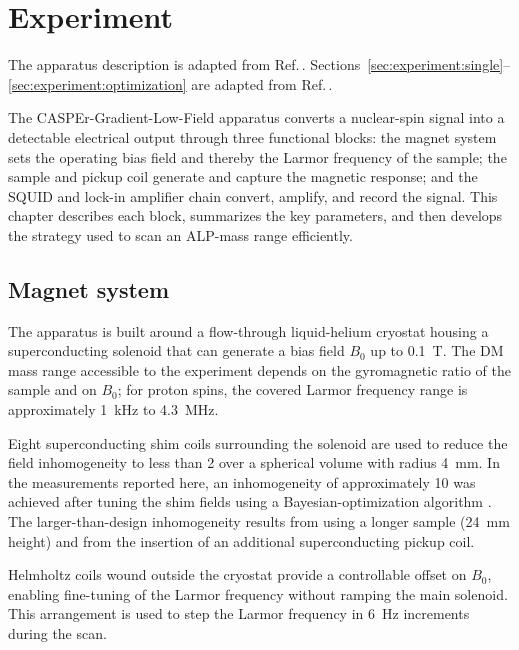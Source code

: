 \chapter{Experiment}\label{chap:experiment}
\begin{jointwork}
    The apparatus description is adapted from Ref.\,\cite{Walter2024_LFthermal}.
    Sections~\ref{sec:experiment:single}--\ref{sec:experiment:optimization} are adapted from Ref.\,\cite{Yuzhe2023_FrequencyScanning}.
\end{jointwork}

The CASPEr-Gradient-Low-Field apparatus converts a nuclear-spin signal into a detectable electrical output through three functional blocks: the magnet system sets the operating bias field and thereby the Larmor frequency of the sample; the sample and pickup coil generate and capture the magnetic response; and the SQUID and lock-in amplifier chain convert, amplify, and record the signal.
This chapter describes each block, summarizes the key parameters, and then develops the strategy used to scan an ALP-mass range efficiently.

\section{Magnet system}\label{sec:apparatus:magnet}

The apparatus is built around a flow-through liquid-helium cryostat housing a superconducting solenoid that can generate a bias field $B_0$ up to \SI{0.1}{\tesla}.
The DM mass range accessible to the experiment depends on the gyromagnetic ratio of the sample and on $B_0$; for proton spins, the covered Larmor frequency range is approximately \SI{1}{\kHz} to \SI{4.3}{\MHz}.

Eight superconducting shim coils surrounding the solenoid are used to reduce the field inhomogeneity to less than \SI{2}{\ppm} over a spherical volume with radius \SI{4}{\mm}.
In the measurements reported here, an inhomogeneity of approximately \SI{10}{\ppm} was achieved after tuning the shim fields using a Bayesian-optimization algorithm \cite{ShimmingPaper}.
The larger-than-design inhomogeneity results from using a longer sample (\SI{24}{\mm} height) and from the insertion of an additional superconducting pickup coil.

Helmholtz coils wound outside the cryostat provide a controllable offset on $B_0$, enabling fine-tuning of the Larmor frequency without ramping the main solenoid.
This arrangement is used to step the Larmor frequency in \SI{6}{\Hz} increments during the scan.

